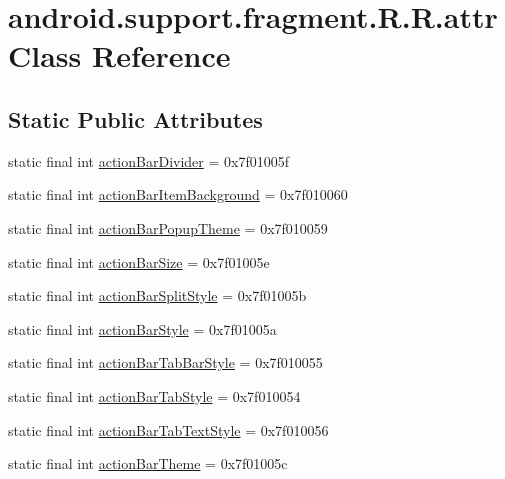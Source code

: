 \hypertarget{classandroid_1_1support_1_1fragment_1_1_r_1_1attr}{
\section{android.support.fragment.R.R.attr Class Reference}
\label{classandroid_1_1support_1_1fragment_1_1_r_1_1attr}
}
\subsection*{Static Public Attributes}
\begin{CompactItemize}
\item 
static final int \hyperlink{classandroid_1_1support_1_1fragment_1_1_r_1_1attr_7b6ce764c69218cd53569252d8d4b8d8}{actionBarDivider} = 0x7f01005f
\item 
static final int \hyperlink{classandroid_1_1support_1_1fragment_1_1_r_1_1attr_13859be2320dd3ad38b0c379caa84da2}{actionBarItemBackground} = 0x7f010060
\item 
static final int \hyperlink{classandroid_1_1support_1_1fragment_1_1_r_1_1attr_3cb45d51c6e54775184a0568d53556b0}{actionBarPopupTheme} = 0x7f010059
\item 
static final int \hyperlink{classandroid_1_1support_1_1fragment_1_1_r_1_1attr_3f686d954572993a7da21abc693f8bd2}{actionBarSize} = 0x7f01005e
\item 
static final int \hyperlink{classandroid_1_1support_1_1fragment_1_1_r_1_1attr_fc7e90cb00f3903903653ff3ee2550db}{actionBarSplitStyle} = 0x7f01005b
\item 
static final int \hyperlink{classandroid_1_1support_1_1fragment_1_1_r_1_1attr_f5ab4ca6451c2a02f30b9950a2514bca}{actionBarStyle} = 0x7f01005a
\item 
static final int \hyperlink{classandroid_1_1support_1_1fragment_1_1_r_1_1attr_44f4df36f857183abe67a7174784a9d5}{actionBarTabBarStyle} = 0x7f010055
\item 
static final int \hyperlink{classandroid_1_1support_1_1fragment_1_1_r_1_1attr_1b3e02713a7fca54abfe62d8a5d13361}{actionBarTabStyle} = 0x7f010054
\item 
static final int \hyperlink{classandroid_1_1support_1_1fragment_1_1_r_1_1attr_9d0ef7fd23688d45395eee8e835ebcea}{actionBarTabTextStyle} = 0x7f010056
\item 
static final int \hyperlink{classandroid_1_1support_1_1fragment_1_1_r_1_1attr_afb29764f0d20326df921f63afa52b21}{actionBarTheme} = 0x7f01005c

\end{CompactItemize}
